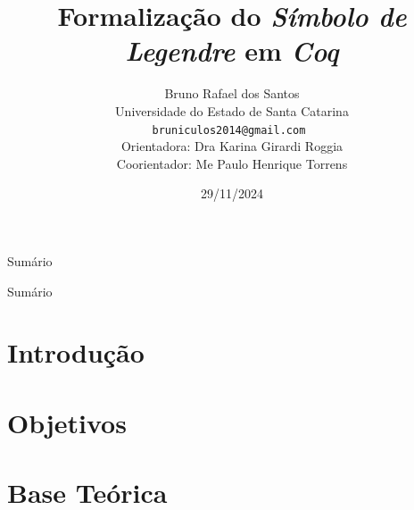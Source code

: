 \documentclass[xcolor=table]{beamer}
\title[]{Formalização do \textit{Símbolo de Legendre} em \textit{Coq}}
\author[Bruno Rafael dos Santos]{
    Bruno Rafael dos Santos\\\smallskip
    {\scriptsize Universidade do Estado de Santa Catarina \\\smallskip
    \texttt{bruniculos2014@gmail.com
    }\\\medskip
    {Orientadora: Dra Karina Girardi Roggia}\\
    {Coorientador: Me Paulo Henrique Torrens}\\
    }
}
\date{29/11/2024}
\begin{document}
    \begin{frame}
        \titlepage
    \end{frame}

    \begin{frame}{Sumário}
        \tableofcontents[sections=0-3]
    \end{frame}
    
    \begin{frame}{Sumário}
        \tableofcontents[sections=4-10]
    \end{frame}

    \section[]{Introdução}
    
        
    
    \section[]{Objetivos}

        



    \section[]{Base Teórica} 
\end{document}
